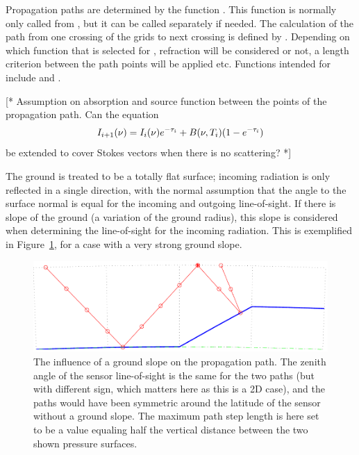 Propagation paths are determined by the function .
This function is normally only called from , but it
can be called separately if needed. The calculation of the path from
one crossing of the grids to next crossing is defined by
. Depending on which function that is
selected for , refraction will be
considered or not, a length criterion between the path points will be
applied etc. Functions intended for 
include  and
.


\label{sec:fm_defs:solverte}

[* Assumption on absorption and source function between the points of
the propagation path. Can the equation 
\begin{equation}
  I_{i+1}(\nu) = I_i(\nu)e^{-\tau_{i}} + B(\nu,T_{i})(1-e^{-\tau_{i}})
\end{equation}
be extended to cover Stokes vectors when there is no scattering? *]



\label{sec:fm_defs:groundrefl}

The ground is treated to be a totally flat surface; incoming radiation
is only reflected in a single direction, with the normal assumption
that the angle to the surface normal is equal for the incoming and
outgoing line-of-sight. If there is slope of the ground (a variation of the ground radius), this slope is considered
when determining the line-of-sight for the incoming radiation. This is
exemplified in Figure~\ref{fig:fm_defs:ppath_cases2}, for a case with
a very strong ground slope.

\begin{figure}[!t]
 \begin{center}
  \includegraphics*[width=0.95\hsize]{Figs/fm_definitions/ppath_cases2}
  \caption{The influence of a ground slope on the propagation path. The zenith
    angle of the sensor line-of-sight is the same for the two paths (but with
    different sign, which matters here as this is a 2D case), and the paths
    would have been symmetric around the latitude of the sensor without a 
    ground slope. The maximum path step length is here set to be a value
    equaling half the vertical distance between the two shown pressure
    surfaces.}
  \label{fig:fm_defs:ppath_cases2}
 \end{center}
\end{figure}

